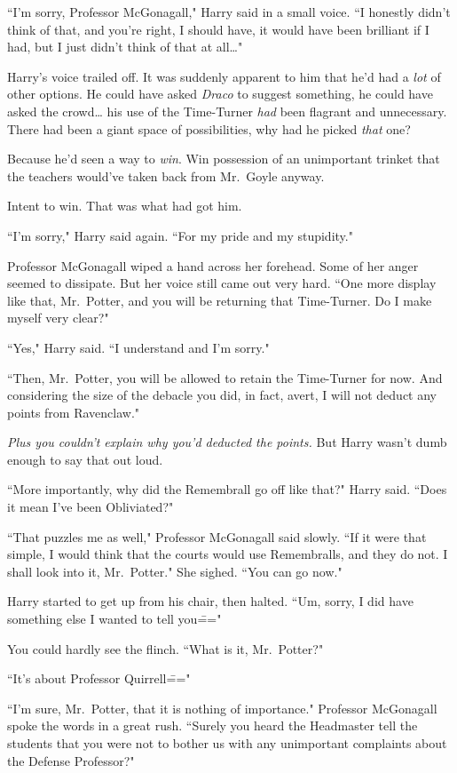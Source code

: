 ``I'm sorry, Professor McGonagall," Harry said in a small voice. ``I honestly didn't think of that, and you're right, I should have, it would have been brilliant if I had, but I just didn't think of that at all{\ldots}"

Harry's voice trailed off. It was suddenly apparent to him that he'd had a \emph{lot} of other options. He could have asked \emph{Draco} to suggest something, he could have asked the crowd{\ldots} his use of the Time-Turner \emph{had} been flagrant and unnecessary. There had been a giant space of possibilities, why had he picked \emph{that} one?

Because he'd seen a way to \emph{win}. Win possession of an unimportant trinket that the teachers would've taken back from Mr.~Goyle anyway.

Intent to win. That was what had got him.

``I'm sorry," Harry said again. ``For my pride and my stupidity."

Professor McGonagall wiped a hand across her forehead. Some of her anger seemed to dissipate. But her voice still came out very hard. ``One more display like that, Mr.~Potter, and you will be returning that Time-Turner. Do I make myself very clear?"

``Yes," Harry said. ``I understand and I'm sorry."

``Then, Mr.~Potter, you will be allowed to retain the Time-Turner for now. And considering the size of the debacle you did, in fact, avert, I will not deduct any points from Ravenclaw."

\emph{Plus you couldn't explain why you'd deducted the points.} But Harry wasn't dumb enough to say that out loud.

``More importantly, why did the Remembrall go off like that?" Harry said. ``Does it mean I've been Obliviated?"

``That puzzles me as well," Professor McGonagall said slowly. ``If it were that simple, I would think that the courts would use Remembralls, and they do not. I shall look into it, Mr.~Potter." She sighed. ``You can go now."

Harry started to get up from his chair, then halted. ``Um, sorry, I did have something else I wanted to tell you\==="

You could hardly see the flinch. ``What is it, Mr.~Potter?"

``It's about Professor Quirrell\==="

``I'm sure, Mr.~Potter, that it is nothing of importance." Professor McGonagall spoke the words in a great rush. ``Surely you heard the Headmaster tell the students that you were not to bother us with any unimportant complaints about the Defense Professor?"

